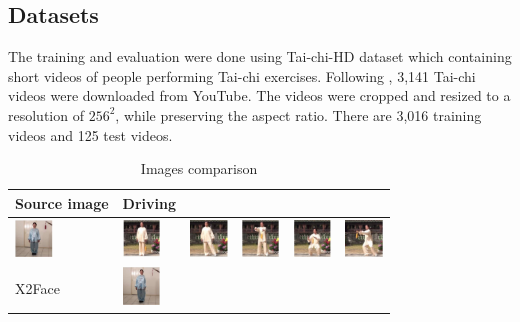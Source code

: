 \documentclass{article}
\begin{document}
\subsection{Datasets}
The training and evaluation were done using Tai-chi-HD dataset which
containing short videos of people performing Tai-chi exercises.
Following \cite{siarohin2020order}, 3,141 Tai-chi videos were downloaded from YouTube.
The videos were cropped and resized to a resolution of $256^2$, while preserving the aspect ratio. There are 3,016 training videos and 125 test videos.

\begin{table}[t]
\caption{Images comparison}
\label{table:images}
\vskip 0.15in
\begin{center}
\begin{small}
\begin{sc}
\begin{tabular}{m{1.0cm}m{1.0cm}m{1.0cm}m{1.0cm}m{1.0cm}m{1.0cm}}
\toprule
Source image & Driving\\
\toprule
\includegraphics[width=1cm, height=1cm]{images/source} &
\includegraphics[width=1cm, height=1cm]{images/driving_1} &
\includegraphics[width=1cm, height=1cm]{images/driving_2} &
\includegraphics[width=1cm, height=1cm]{images/driving_3} &
\includegraphics[width=1cm, height=1cm]{images/driving_4} &
\includegraphics[width=1cm, height=1cm]{images/driving_5} \\
\midrule
X2Face & \includegraphics[width=1cm, height=1cm]{images/1_X2Face_1} &

\end{tabular}
\end{sc}
\end{small}
\end{center}
\end{table}
\end{document}
